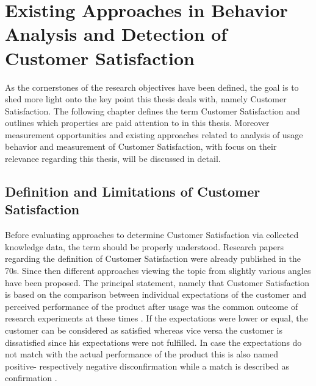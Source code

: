 \chapter{Existing Approaches in Behavior Analysis and Detection of Customer Satisfaction}
\label{ch:backgroundResearch}
As the cornerstones of the research objectives have been defined, the goal is to shed more light onto the key point this thesis deals with, namely Customer Satisfaction. The following chapter defines the term Customer Satisfaction and outlines which properties are paid attention to in this thesis. Moreover measurement opportunities and existing approaches related to analysis of usage behavior and measurement of Customer Satisfaction, with focus on their relevance regarding this thesis, will be discussed in detail.

\section{Definition and Limitations of Customer Satisfaction}
\label{sec:custSatisfactionDefinition}
Before evaluating approaches to determine Customer Satisfaction via collected knowledge data, the term should be properly understood. Research papers regarding the definition of Customer Satisfaction were already published in the 70s. Since then different approaches viewing the topic from slightly various angles have been proposed. The principal statement, namely that Customer Satisfaction is based on the comparison between individual expectations of the customer and perceived performance of the product after usage was the common outcome of research experiments at these times \cite{oliver1977effect} \cite{anderson1973consumer}. If the expectations were lower or equal, the customer can be considered as satisfied whereas vice versa the customer is dissatisfied since his expectations were not fulfilled. In case the expectations do not match with the actual performance of the product this is also named positive- respectively negative disconfirmation while a match is described as confirmation \cite{oliver1977effect} \cite{anderson1973consumer}.

